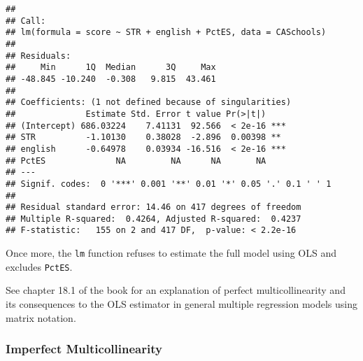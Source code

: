 \documentclass[]{book}
\newenvironment{Shaded}{\begin{snugshade}}{\end{snugshade}}
\newcommand{\KeywordTok}[1]{\textcolor[rgb]{0.13,0.29,0.53}{\textbf{#1}}}
\newcommand{\DataTypeTok}[1]{\textcolor[rgb]{0.13,0.29,0.53}{#1}}
\newcommand{\DecValTok}[1]{\textcolor[rgb]{0.00,0.00,0.81}{#1}}
\newcommand{\StringTok}[1]{\textcolor[rgb]{0.31,0.60,0.02}{#1}}
\newcommand{\CommentTok}[1]{\textcolor[rgb]{0.56,0.35,0.01}{\textit{#1}}}
\newcommand{\OperatorTok}[1]{\textcolor[rgb]{0.81,0.36,0.00}{\textbf{#1}}}
\newcommand{\NormalTok}[1]{#1}
\theoremstyle{definition}
\theoremstyle{definition}
\theoremstyle{definition}
\theoremstyle{remark}
\begin{document}
\begin{Shaded}
\end{Shaded}

\begin{verbatim}
## 
## Call:
## lm(formula = score ~ STR + english + PctES, data = CASchools)
## 
## Residuals:
##     Min      1Q  Median      3Q     Max 
## -48.845 -10.240  -0.308   9.815  43.461 
## 
## Coefficients: (1 not defined because of singularities)
##              Estimate Std. Error t value Pr(>|t|)    
## (Intercept) 686.03224    7.41131  92.566  < 2e-16 ***
## STR          -1.10130    0.38028  -2.896  0.00398 ** 
## english      -0.64978    0.03934 -16.516  < 2e-16 ***
## PctES              NA         NA      NA       NA    
## ---
## Signif. codes:  0 '***' 0.001 '**' 0.01 '*' 0.05 '.' 0.1 ' ' 1
## 
## Residual standard error: 14.46 on 417 degrees of freedom
## Multiple R-squared:  0.4264, Adjusted R-squared:  0.4237 
## F-statistic:   155 on 2 and 417 DF,  p-value: < 2.2e-16
\end{verbatim}

Once more, the \texttt{lm} function refuses to estimate the full model
using OLS and excludes \texttt{PctES}.

See chapter 18.1 of the book for an explanation of perfect
multicollinearity and its consequences to the OLS estimator in general
multiple regression models using matrix notation.

\subsubsection*{Imperfect
Multicollinearity}\label{imperfect-multicollinearity}
\end{document}
